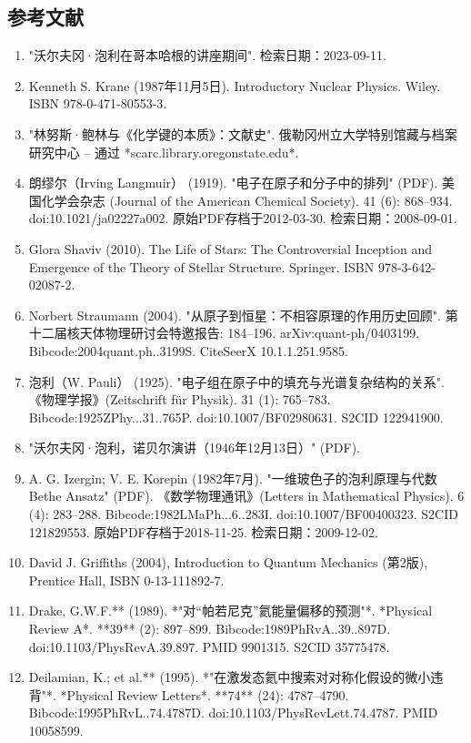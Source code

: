 \subsection{参考文献} 
\begin{enumerate}
\item "沃尔夫冈·泡利在哥本哈根的讲座期间". 检索日期：2023-09-11.  
\item Kenneth S. Krane (1987年11月5日). Introductory Nuclear Physics. Wiley. ISBN 978-0-471-80553-3.  
\item "林努斯·鲍林与《化学键的本质》：文献史". 俄勒冈州立大学特别馆藏与档案研究中心 – 通过 *scarc.library.oregonstate.edu*.  
\item 朗缪尔（Irving Langmuir） (1919). "电子在原子和分子中的排列" (PDF). 美国化学会杂志 (Journal of the American Chemical Society). 41 (6): 868–934. doi:10.1021/ja02227a002. 原始PDF存档于2012-03-30. 检索日期：2008-09-01.  
\item Glora Shaviv (2010). The Life of Stars: The Controversial Inception and Emergence of the Theory of Stellar Structure. Springer. ISBN 978-3-642-02087-2.  
\item Norbert Straumann (2004). "从原子到恒星：不相容原理的作用历史回顾". 第十二届核天体物理研讨会特邀报告: 184–196. arXiv:quant-ph/0403199. Bibcode:2004quant.ph..3199S. CiteSeerX 10.1.1.251.9585.  
\item 泡利（W. Pauli） (1925). "电子组在原子中的填充与光谱复杂结构的关系". 《物理学报》(Zeitschrift für Physik). 31 (1): 765–783. Bibcode:1925ZPhy...31..765P. doi:10.1007/BF02980631. S2CID 122941900.  
\item "沃尔夫冈·泡利，诺贝尔演讲（1946年12月13日）" (PDF).  
\item A. G. Izergin; V. E. Korepin (1982年7月). "一维玻色子的泡利原理与代数 Bethe Ansatz" (PDF). 《数学物理通讯》(Letters in Mathematical Physics). 6 (4): 283–288. Bibcode:1982LMaPh...6..283I. doi:10.1007/BF00400323. S2CID 121829553. 原始PDF存档于2018-11-25. 检索日期：2009-12-02.  
\item David J. Griffiths (2004), Introduction to Quantum Mechanics (第2版), Prentice Hall, ISBN 0-13-111892-7.
\item Drake, G.W.F.** (1989). *"对“帕若尼克”氦能量偏移的预测"*. *Physical Review A*. **39** (2): 897–899. Bibcode:1989PhRvA..39..897D. doi:10.1103/PhysRevA.39.897. PMID 9901315. S2CID 35775478.  
\item Deilamian, K.; et al.** (1995). *"在激发态氦中搜索对对称化假设的微小违背"*. *Physical Review Letters*. **74** (24): 4787–4790. Bibcode:1995PhRvL..74.4787D. doi:10.1103/PhysRevLett.74.4787. PMID 10058599.  

\end{enumerate}

